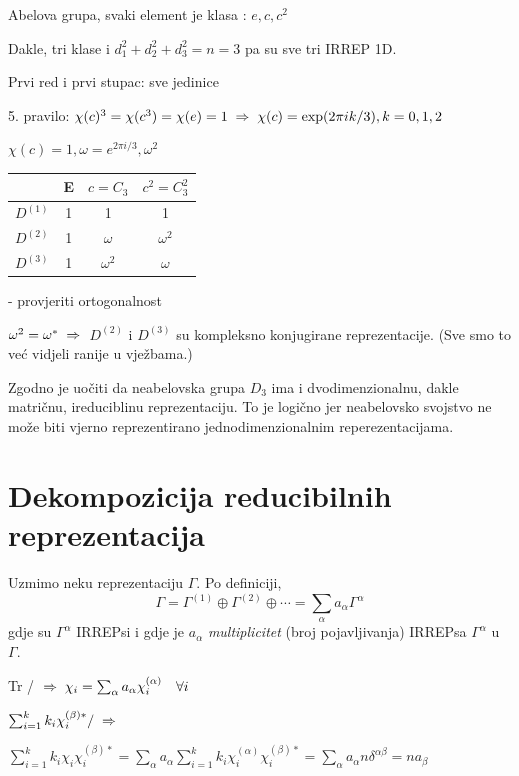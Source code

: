 \begin{primjer}[$C_3$]

Abelova grupa, svaki element je klasa : $e, c, c^2$

Dakle, tri klase i $d_{1}^2+d_{2}^2+d_{3}^2 = n =3$ pa su
sve tri IRREP 1D.

Prvi red i prvi stupac: sve jedinice

5. pravilo: $\chi(c)^3=\chi(c^3)=\chi(e)=1 \;\Rightarrow\; \chi(c)=
  \exp(2\pi i k/3), k=0, 1, 2 $

$\chi(c)=1, \omega=e^{2\pi i/3}, \omega^2$

\begin{tabular}{c|ccc}
  & E & $c=C_3$  & $c^2=C_{3}^2$ \\ \hline
$D^{(1)}$ & 1 & 1& 1 \\
$D^{(2)}$ & 1 & $\omega$ &$\omega^2$  \\
 $D^{(3)}$  & 1 &$\omega^2$ & $\omega$ 
\end{tabular}

- provjeriti ortogonalnost

$\omega^2 = \omega^* \;\Rightarrow\;$ $D^{(2)}$ i $D^{(3)}$ su kompleksno
konjugirane reprezentacije. (Sve smo to već vidjeli ranije u
vježbama.)


Zgodno je uočiti da neabelovska grupa $D_3$ ima i dvodimenzionalnu, dakle matričnu,
ireduciblinu reprezentaciju. To je logično jer neabelovsko svojstvo ne može biti
vjerno reprezentirano jednodimenzionalnim reperezentacijama.
\end{primjer}

\section{Dekompozicija reducibilnih reprezentacija}

Uzmimo neku reprezentaciju $\Gamma$. Po definiciji,
\begin{displaymath}
  \Gamma = \Gamma^{(1)}\oplus\Gamma^{(2)}\oplus\cdots =
     \sum_{\alpha}  a_{\alpha} \Gamma^{\alpha}
\end{displaymath}
gdje su $\Gamma^{\alpha}$ IRREPsi i
gdje je $a_{\alpha}$ \emph{multiplicitet} (broj pojavljivanja) 
IRREPsa $\Gamma^{\alpha}$ u $\Gamma$.


Tr / $ \;\Rightarrow\;  \chi_i = \sum_{\alpha}  a_{\alpha} \chi^{(\alpha)}_i \quad 
  \forall i$

$\sum_{i=1}^{k} k_i \chi^{(\beta)*}_i /  \;\Rightarrow\; $

$\sum_{i=1}^{k} k_i \chi_i \chi^{(\beta)*}_i =
\sum_{\alpha}  a_{\alpha} \sum_{i=1}^{k} k_i\chi^{(\alpha)}_i \chi^{(\beta)*}_i
=\sum_{\alpha}  a_{\alpha} n \delta^{\alpha \beta} = n a_{\beta} $


